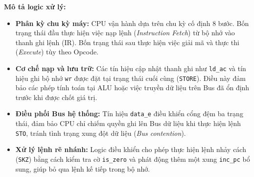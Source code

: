 \textbf{Mô tả logic xử lý:}
\begin{itemize}
    \item \textbf{Phân kỳ chu kỳ máy:} CPU vận hành dựa trên chu kỳ cố định 8 bước. Bốn trạng thái đầu thực hiện việc nạp lệnh (\textit{Instruction Fetch}) từ bộ nhớ vào thanh ghi lệnh (IR). Bốn trạng thái sau thực hiện việc giải mã và thực thi (\textit{Execute}) tùy theo Opcode.
    \item \textbf{Cơ chế nạp và lưu trữ:} Các tín hiệu cập nhật thanh ghi như \texttt{ld\_ac} và tín hiệu ghi bộ nhớ \texttt{wr} được đặt tại trạng thái cuối cùng (\texttt{STORE}). Điều này đảm bảo các phép tính toán tại ALU hoặc việc truyền dữ liệu trên Bus đã ổn định trước khi được chốt giá trị.
    \item \textbf{Điều phối Bus hệ thống:} Tín hiệu \texttt{data\_e} điều khiển cổng đệm ba trạng thái, đảm bảo CPU chỉ chiếm quyền ghi lên Bus dữ liệu khi thực hiện lệnh \texttt{STO}, tránh tình trạng xung đột dữ liệu (\textit{Bus contention}).
    \item \textbf{Xử lý lệnh rẽ nhánh:} Logic điều khiển cho phép thực hiện lệnh nhảy cách (\texttt{SKZ}) bằng cách kiểm tra cờ \texttt{is\_zero} và phát động thêm một xung \texttt{inc\_pc} bổ sung, giúp bỏ qua lệnh kế tiếp trong bộ nhớ.
\end{itemize}